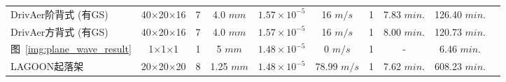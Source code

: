 \begin{table}
\begin{center}
{\begin{tabular}{lccccccccc}
				DrivAer阶背式 (有GS)         					& 40$\times$20$\times$16		& 7 				& 4.0 $mm$					& $1.57\!\times\!10^{-5}$	& 16 $m/s$			& 1					& 7.83 $min.$			& 126.40 $min.$			\\
				DrivAer方背式 (有GS)         					& 40$\times$20$\times$16		& 7 				& 4.0 $mm$					& $1.57\!\times\!10^{-5}$	& 16 $m/s$			& 1					& 8.00 $min.$			& 120.73 $min.$			\\
				图~\ref{img:plane_wave_result}          		& 1$\times$1$\times$1			& 1 				& 5 $mm$					& $1.48\!\times\!10^{-5}$	& 0 $m/s$			& 1					& -						& 6.46 $min.$			\\
				LAGOON起落架			          				& 20$\times$20$\times$20		& 8 				& 1.25 $mm$					& $1.48\!\times\!10^{-5}$	& 78.99 $m/s$		& 1					& 7.62 $min.$			& 608.23 $min.$			\\
        \bottomrule
		\end{tabular}}
	\end{center}
	\vspace{-3.5mm}
	\label{tab:parameter-time}
\end{table}